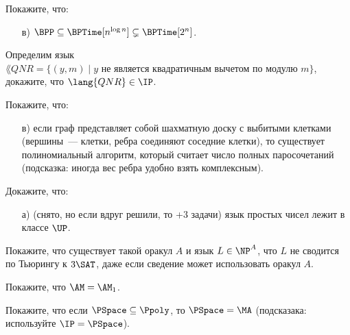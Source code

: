 

\begin{ptask}{44}
    Покажите, что:
	\begin{enumerate}[topsep = 0pt, itemsep = -1ex]
        \item [в)] $\BPP \subseteq \BPTime[n^{\log n}] \subsetneq \BPTime[2^n]$.
    \end{enumerate}
\end{ptask}

\begin{ptask}{45}
    Определим язык $\lang{QNR} = \{(y, m) \mid \text{$y$ не является квадратичным вычетом по модулю $m$}\}$, докажите, что
    $\lang{QNR} \in \IP$.
\end{ptask}


\begin{ptask}{49}
    Покажите, что:
    \begin{enumerate}[topsep = 0pt, itemsep = -1ex]
        \item [в)] если граф представляет собой шахматную доску с выбитыми клетками
            (вершины~--- клетки, ребра соединяют соседние клетки), то существует
            полиномиальный алгоритм, который считает число полных паросочетаний
            (подсказка: иногда вес ребра удобно взять комплексным).
    \end{enumerate}
\end{ptask}


\begin{ptask}{54}
    Докажите, что: 
    \begin{enumerate}[topsep = 0pt, itemsep = -1ex]
        \item [а)] (снято, но если вдруг решили, то +3 задачи) язык простых чисел лежит в классе $\UP$.
    \end{enumerate}
\end{ptask}

\begin{ptask}{55}
    Покажите, что существует такой оракул $A$ и язык $L \in \NP^A$, что $L$ не
    сводится по Тьюрингу к $3\SAT$, даже если сведение может использовать оракул $A$.
\end{ptask}

\begin{ptask}{57}
    Покажите, что $\AM = \AM_1$.
\end{ptask}

\begin{ptask}{59}
    Покажите, что если $\PSpace \subseteq \Ppoly$, то $\PSpace = \MA$ (подсказака: используйте $\IP = \PSpace$).
\end{ptask}

